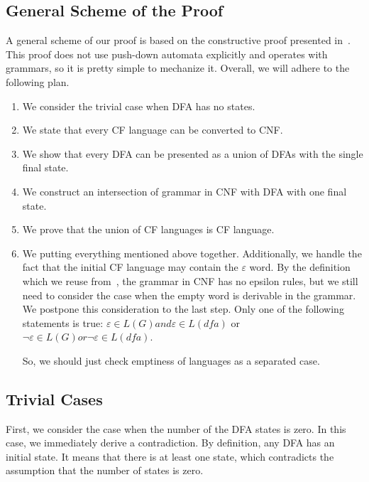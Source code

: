 \subsection{General Scheme of the Proof}

A general scheme of our proof is based on the constructive proof presented in~\cite{beigelproof}.
This proof does not use push-down automata explicitly and operates with grammars, so it is pretty simple to mechanize it.
Overall, we will adhere to the following plan.

\begin{enumerate}
    \item We consider the trivial case when DFA has no states.
    \item We state that every CF language can be converted to CNF.
    \item We show that every DFA can be presented as a union of DFAs with the single final state.
    \item We construct an intersection of grammar in CNF with DFA with one final state.
    \item We prove that the union of CF languages is CF language.
    \item We putting everything mentioned above together.
	Additionally, we handle the fact that the initial CF language may contain the $\varepsilon$ word. By the definition which we reuse from~\cite{smolkaHofmann2016}, the grammar in CNF has no epsilon rules, but we still need to consider the case when the empty word is derivable in the grammar. We postpone this consideration to the last step. Only one of the following statements is true: $\varepsilon \in L(G) and \varepsilon \in L(\textit{dfa})$ or $\neg \varepsilon \in L(G) or \neg \varepsilon \in L(\textit{dfa})$.

So, we should just check emptiness of languages as a separated case.

\end{enumerate}


\subsection{Trivial Cases}

First, we consider the case when the number of the DFA states is zero.
In this case, we immediately derive a contradiction.
By definition, any DFA has an initial state.
It means that there is at least one state, which contradicts the assumption that the number of states is zero.

